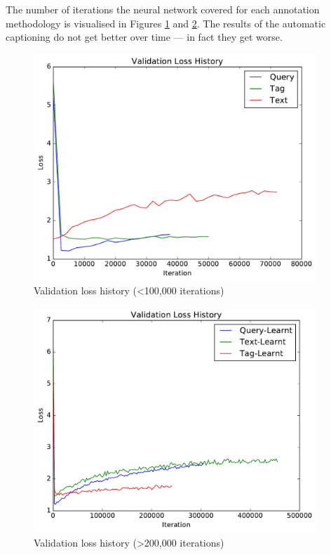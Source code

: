 The number of iterations the neural network covered for each annotation methodology is visualised in Figures \ref{fig:val-loss-1} and \ref{fig:val-loss-2}. The results of the automatic captioning do not get better over time --- in fact they get worse.

\begin{figure}[h]
    \centering
    \includegraphics[width=0.95\textwidth]{graphs/initial-validation-loss-history}
    \caption{Validation loss history (\textless 100,000 iterations)}
    \label{fig:val-loss-1}
\end{figure}

\begin{figure}[h]
    \centering
    \includegraphics[width=0.95\textwidth]{graphs/validation-loss-history}
    \caption{Validation loss history (\textgreater 200,000 iterations)}
    \label{fig:val-loss-2}
\end{figure}

